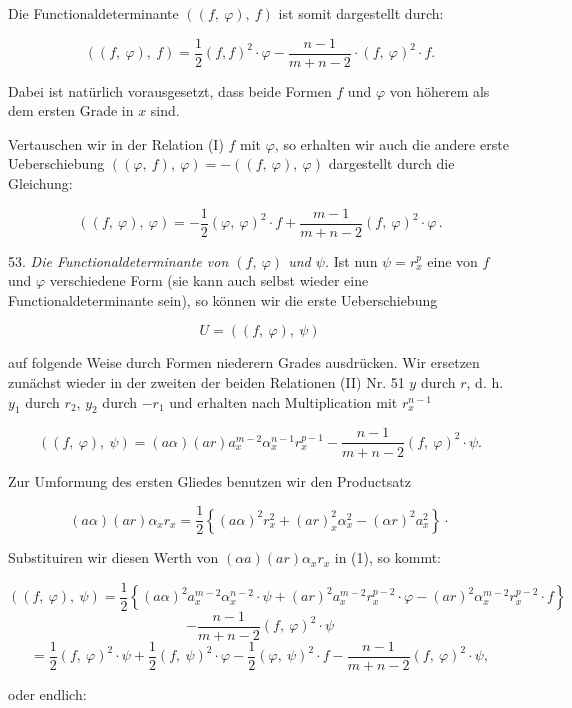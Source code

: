 \documentclass[11pt]{article}
\providecommand{\weberpage}[1]{}
\providecommand{\weq}[2]{\begin{equation}\tag{#1}#2\end{equation}}
\begin{document}
\weberpage{57}
Die Functionaldeterminante $((f,\ \varphi),\ f)$ ist somit dargestellt durch:

\weq{I}{((f,\ \varphi),\ f) = \frac{1}{2}(f,f)^2\cdot\varphi - \frac{n-1}{m+n-2}\cdot(f,\ \varphi)^2\cdot f.}

Dabei ist natürlich vorausgesetzt, dass beide Formen $f$ und $\varphi$ von höherem als dem ersten Grade in $x$ sind.

Vertauschen wir in der Relation (I) $f$ mit $\varphi$, so erhalten wir auch die andere erste Ueberschiebung $((\varphi,\ f),\ \varphi) = -((f,\ \varphi),\ \varphi)$ dargestellt durch die Gleichung:

\weq{II}{((f,\ \varphi),\ \varphi) = -\frac{1}{2}(\varphi,\ \varphi)^2\cdot f + \frac{m-1}{m+n-2}(f,\ \varphi)^2\cdot\varphi\,.}

53. \textit{Die Functionaldeterminante von $(f,\ \varphi)$ und $\psi$.} Ist nun $\psi = r_x^p$ eine von $f$ und $\varphi$ verschiedene Form (sie kann auch selbst wieder eine Functionaldeterminante sein), so können wir die erste Ueberschiebung

\[
U = ((f,\ \varphi),\ \psi)
\]

auf folgende Weise durch Formen niederern Grades ausdrücken. Wir ersetzen zunächst wieder in der zweiten der beiden Relationen (II) Nr. 51 $y$ durch $r$, d. h. $y_1$ durch $r_2$, $y_2$ durch $-r_1$ und erhalten nach Multiplication mit $r_x^{n-1}$

\weq{1}{((f,\ \varphi),\ \psi) = (a\alpha)(ar)a_x^{m-2}\alpha_x^{n-1}r_x^{p-1} - \frac{n-1}{m+n-2}(f,\ \varphi)^2\cdot\psi.}

Zur Umformung des ersten Gliedes benutzen wir den Productsatz

\[
(a\alpha)(ar)\alpha_x r_x = \frac{1}{2}\left\{(a\alpha)^2 r_x^2 + (ar)_x^2\alpha_x^2 - (\alpha r)^2 a_x^2\right\}\cdot
\]

Substituiren wir diesen Werth von $(\alpha a)(ar)\alpha_x r_x$ in (1), so kommt:

\[
((f,\ \varphi),\ \psi) = \frac{1}{2}\left\{(a\alpha)^2 a_x^{m-2}\alpha_x^{n-2}\cdot\psi + (ar)^2 a_x^{m-2}r_x^{p-2}\cdot\varphi - (ar)^2\alpha_x^{m-2}r_x^{p-2}\cdot f\right\}
\]
\[
- \frac{n-1}{m+n-2}(f,\ \varphi)^2\cdot\psi
\]
\[
= \frac{1}{2}(f,\ \varphi)^2\cdot\psi + \frac{1}{2}(f,\ \psi)^2\cdot\varphi - \frac{1}{2}(\varphi,\ \psi)^2\cdot f - \frac{n-1}{m+n-2}(f,\ \varphi)^2\cdot\psi,
\]

oder endlich:
\end{document}
